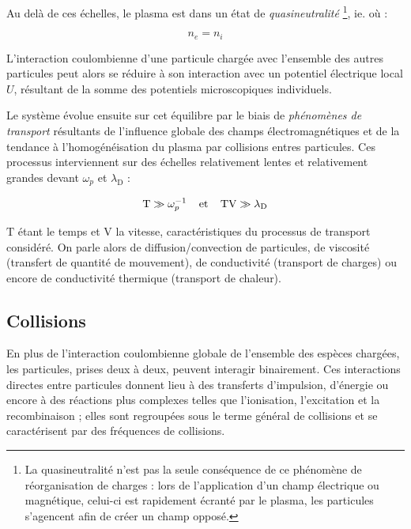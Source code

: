 \begin{refsection}
Au delà de ces échelles, le plasma est dans un état de \emph{quasineutralité}
\footnote{La quasineutralité n'est pas la seule conséquence de ce phénomène de
réorganisation de charges : lors de l'application d'un champ électrique ou magnétique, celui-ci est rapidement
écranté par le plasma, les particules s'agencent afin de créer un champ
opposé.}, ie. où :

\begin{equation}
n_e=n_i
\label{quasineutralité}
\end{equation}

L'interaction coulombienne d'une particule chargée avec l'ensemble des autres particules peut alors
se réduire à son interaction avec un potentiel électrique local $U$,
résultant de la somme des potentiels microscopiques individuels.

Le système évolue ensuite sur cet équilibre par le biais de
\emph{phénomènes de transport} résultants de l'influence
globale des champs électromagnétiques et de la tendance à
l'homogénéisation du plasma par collisions entres particules.
Ces processus interviennent sur des échelles relativement
lentes et relativement grandes devant $\omega_{p}$ et $\lambda_\text{D}$ :

\begin{equation}
\text{T}\gg \omega_{p}^{{-1}}
\;\;\;\;\text{et}\;\;\;\;\text{TV}\gg\lambda_\text{D}
\end{equation}

$\text{T}$ étant le temps et $\text{V} $ la vitesse, caractéristiques du
processus de transport considéré.
On parle alors de diffusion/convection de particules, de viscosité (transfert de
quantité de mouvement), de conductivité (transport de charges) ou encore de
conductivité thermique (transport de chaleur).

\subsection{Collisions}
\label{1-Collisions}
En plus de l'interaction coulombienne globale de l'ensemble des espèces chargées, 
les particules, prises deux à deux, peuvent interagir binairement. 
Ces interactions directes entre particules donnent lieu à des transferts
d'impulsion, d'énergie ou encore à des réactions plus complexes telles que
l'ionisation, l'excitation et la recombinaison ; elles sont regroupées
sous le terme général de collisions et se caractérisent par des fréquences de
collisions.


\end{refsection}
